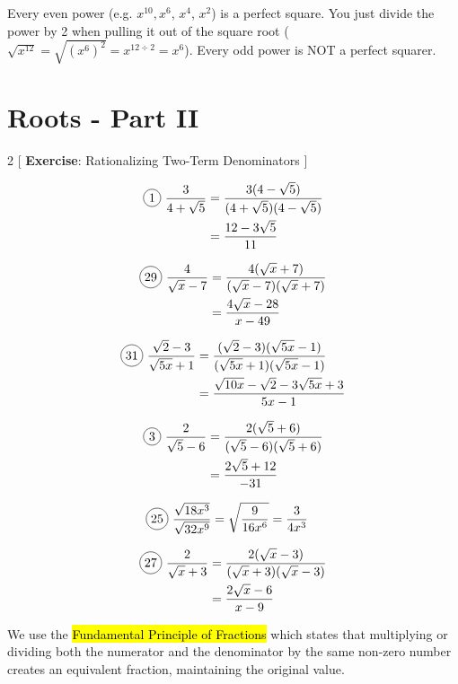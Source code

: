 Every even power (e.g. $x^{10}, $$x^{6}$, $x^{4}$, $x^{2}$) is a perfect square. You just divide the power by 2 when pulling it out of the square root ($\sqrt{x^{12}}=\sqrt{(x^{6})^{2}}=x^{12\div 2}=x^{6}$). Every odd power is NOT a perfect squarer.

\section{Roots - Part II}

\begin{multicols}{2}
[
  \textbf{Exercise}: Rationalizing Two-Term Denominators
]

\begin{align*}
  \circled{1}\ \frac{3}{4+\sqrt{5}}&=\frac{3(4-\sqrt{5})}{(4+\sqrt{5})(4-\sqrt{5})}\\
  &=\frac{12-3\sqrt{5}}{11}
\end{align*}

\begin{align*}
  \circled{29}\ \frac{4}{\sqrt{x}-7}&=\frac{4(\sqrt{x}+7)}{(\sqrt{x}-7)(\sqrt{x}+7)}\\
  &=\frac{4\sqrt{x}-28}{x-49}
\end{align*}

\begin{align*}
  \circled{31}\ \frac{\sqrt{2}-3}{\sqrt{5x}+1}&=\frac{(\sqrt{2}-3)(\sqrt{5x}-1)}{(\sqrt{5x}+1)(\sqrt{5x}-1)}\\
  &=\frac{\sqrt{10x}-\sqrt{2}-3\sqrt{5x}+3}{5x-1}
\end{align*}

\begin{align*}
  \circled{3}\ \frac{2}{\sqrt{5}-6}&=\frac{2(\sqrt{5}+6)}{(\sqrt{5}-6)(\sqrt{5}+6)}\\
  &=\frac{2\sqrt{5}+12}{-31}
\end{align*}

\begin{align*}
  \circled{25}\ \frac{\sqrt{18x^{3}}}{\sqrt{32x^{9}}}&=\sqrt{\frac{9}{16x^{6}}}=\frac{3}{4x^{3}}
\end{align*}

\begin{align*}
  \circled{27}\ \frac{2}{\sqrt{x}+3}&=\frac{2(\sqrt{x}-3)}{(\sqrt{x}+3)(\sqrt{x}-3)}\\
  &=\frac{2\sqrt{x}-6}{x-9}
\end{align*}

\end{multicols}

We use the \hl{Fundamental Principle of Fractions} which states that multiplying or dividing both the numerator and the denominator by the same non-zero number creates an equivalent fraction, maintaining the original value.
